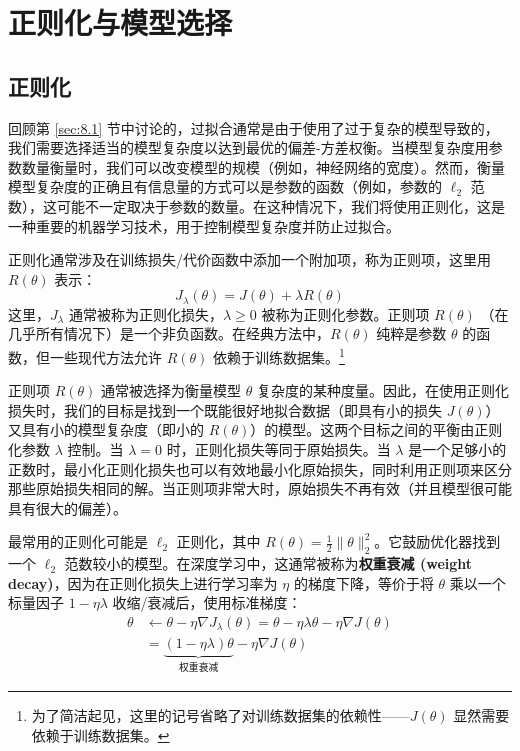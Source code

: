 \chapter{正则化与模型选择}\label{chapter:9}

\section{正则化}\label{sec:9.1}

回顾第 \ref{sec:8.1} 节中讨论的，过拟合通常是由于使用了过于复杂的模型导致的，我们需要选择适当的模型复杂度以达到最优的偏差-方差权衡。当模型复杂度用参数数量衡量时，我们可以改变模型的规模（例如，神经网络的宽度）。然而，衡量模型复杂度的正确且有信息量的方式可以是参数的函数（例如，参数的 $\ell_2$ 范数），这可能不一定取决于参数的数量。在这种情况下，我们将使用正则化，这是一种重要的机器学习技术，用于控制模型复杂度并防止过拟合。

正则化通常涉及在训练损失/代价函数中添加一个附加项，称为正则项，这里用 $R(\theta)$ 表示：
\begin{equation}
    J_\lambda(\theta) = J(\theta) + \lambda R(\theta)
    \label{eq:9.1}
\end{equation}
这里，$J_\lambda$ 通常被称为正则化损失，$\lambda \geq 0$ 被称为正则化参数。正则项 $R(\theta)$ （在几乎所有情况下）是一个非负函数。在经典方法中，$R(\theta)$ 纯粹是参数 $\theta$ 的函数，但一些现代方法允许 $R(\theta)$ 依赖于训练数据集。\footnote{为了简洁起见，这里的记号省略了对训练数据集的依赖性——$J(\theta)$ 显然需要依赖于训练数据集。}

正则项 $R(\theta)$ 通常被选择为衡量模型 $\theta$ 复杂度的某种度量。因此，在使用正则化损失时，我们的目标是找到一个既能很好地拟合数据（即具有小的损失 $J(\theta)$）又具有小的模型复杂度（即小的 $R(\theta)$）的模型。这两个目标之间的平衡由正则化参数 $\lambda$ 控制。当 $\lambda = 0$ 时，正则化损失等同于原始损失。当 $\lambda$ 是一个足够小的正数时，最小化正则化损失也可以有效地最小化原始损失，同时利用正则项来区分那些原始损失相同的解。当正则项非常大时，原始损失不再有效（并且模型很可能具有很大的偏差）。

最常用的正则化可能是 $\ell_2$ 正则化，其中 $R(\theta) = \frac{1}{2}\|\theta\|_2^2$。它鼓励优化器找到一个 $\ell_2$ 范数较小的模型。在深度学习中，这通常被称为\textbf{权重衰减 (weight decay)}，因为在正则化损失上进行学习率为 $\eta$ 的梯度下降，等价于将 $\theta$ 乘以一个标量因子 $1 - \eta\lambda$ 收缩/衰减后，使用标准梯度：
\begin{align}
    \theta &\leftarrow \theta - \eta \nabla J_\lambda(\theta) = \theta - \eta \lambda \theta - \eta \nabla J(\theta) \nonumber \\
    &= \underbrace{(1 - \eta \lambda)\theta}_{\text{权重衰减}} - \eta \nabla J(\theta)
    \label{eq:9.2}
\end{align}

